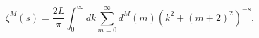 \begin{equation}
\zeta^M(s)=\frac{2L}{\pi}\int_0^\infty dk \sum_{m=0}^\infty d^M(m)
\left(k^2+(m+2)^2\right)^{-s},
\end{equation}

